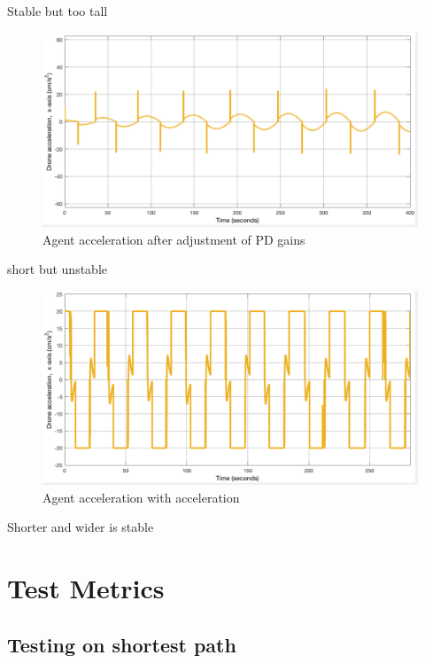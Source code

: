 Stable but too tall

\begin{figure}[H]
  \centering
  \includegraphics[width=1\columnwidth]{figures/SA_accel_pre_post_p_adjustment}
  \caption{\label{fig:post_adjust}Agent acceleration after adjustment of PD gains}
\end{figure}

short but unstable

\begin{figure}[H]
  \centering
  \includegraphics[width=1\columnwidth]{figures/SA_accel_post_final_adjustment}
  \caption{\label{fig:post_limit}Agent acceleration with acceleration}
\end{figure}

Shorter and wider is stable

\section{Test Metrics}
\label{sec:test_metrics}

\subsection{Testing on shortest path}




